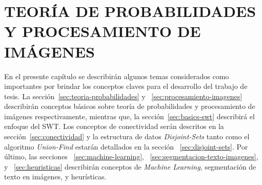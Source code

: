 \chapter{TEORÍA DE PROBABILIDADES Y PROCESAMIENTO DE IMÁGENES}
\label{cap:marcoteorico}
\setcounter{secnumdepth}{0}
  En el presente capítulo se describirán algunos temas considerados como 
  importantes por brindar los conceptos claves para el desarrollo del trabajo de 
  tesis. La sección~\ref{sec:teoria-probabilidades} y 
  ~\ref{sec:procesamiento-imagenes} describirán conceptos básicos sobre teoría de 
  probabilidades y procesamiento de imágenes respectivamente, mientras que, la
  sección~\ref{sec:basics-swt} describirá el enfoque del SWT. Los conceptos de 
  conectividad serán descritos en la sección~\ref{sec:conectividad} y la 
  estructura de datos \textit{Disjoint-Sets} tanto como el algoritmo 
  \textit{Union-Find} estarán detallados en la sección ~\ref{sec:disjoint-sets}.
  Por último, las secciones ~\ref{sec:machine-learning}, 
  ~\ref{sec:segmentacion-texto-imagenes}, y ~\ref{sec:heuristicas} describirán 
  conceptos de \textit{Machine Learning}, segmentación de texto en 
  imágenes, y heurísticas.
\setcounter{secnumdepth}{3}

